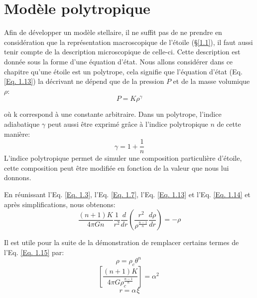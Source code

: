 \section{Modèle polytropique}\label{1.2}

Afin de développer un modèle stellaire, il ne suffit pas de ne prendre en considération que la représentation macroscopique de l'étoile (§\ref{1.1}), il faut aussi tenir compte de la description microscopique de celle-ci. Cette description est donnée sous la forme d'une équation d'état. Nous allons considérer dans ce chapitre qu'une étoile est un polytrope, cela signifie que l'équation d'état (Eq. \ref{Eq. 1.13}) la décrivant ne dépend que de la pression $P$ et de la masse volumique $\rho$:\begin{equation}P=K\rho^{\gamma}\label{Eq. 1.13}\end{equation}

où k correspond à une constante arbitraire. Dans un polytrope, l'indice adiabatique $\gamma$ peut aussi être exprimé grâce à l'indice polytropique $n$ de cette manière:\begin{equation}\gamma=1+\dfrac{1}{n}\label{Eq. 1.14}\end{equation} L'indice polytropique permet de simuler une composition particulière d'étoile, cette composition peut être modifiée en fonction de la valeur que nous lui donnons. \bigskip

En réunissant l'Eq. \ref{Eq. 1.3}, l'Eq. \ref{Eq. 1.7}, l'Eq. \ref{Eq. 1.13} et l'Eq. \ref{Eq. 1.14} et après simplifications, nous obtenons\footnotemark[5]:\begin{equation}\dfrac{(n+1)K}{4\pi Gn}\dfrac{1}{r^{2}}\dfrac{d}{dr}\left( \dfrac{r^{2}}{\rho^{\frac{n-1}{n}}}\dfrac{d\rho}{dr}\right) =-\rho\label{Eq. 1.15}\end{equation}

\vfill
{}



Il est utile pour la suite de la démonstration de remplacer certains termes de l'Eq. \ref{Eq. 1.15} par:
\begin{equation}\rho=\rho_{c} \theta^{n}\hspace{3pt}\label{Eq. 1.16}\end{equation}
\begin{equation}\left[\dfrac{(n+1)K}{4\pi G\rho^{\frac{n-1}{n}}_{c}}\right]=\alpha^{2}\hspace{3pt}\label{Eq. 1.17}\end{equation} 
\begin{equation}r=\alpha\hspace{1pt}\xi\label{Eq. 1.18}\end{equation}

